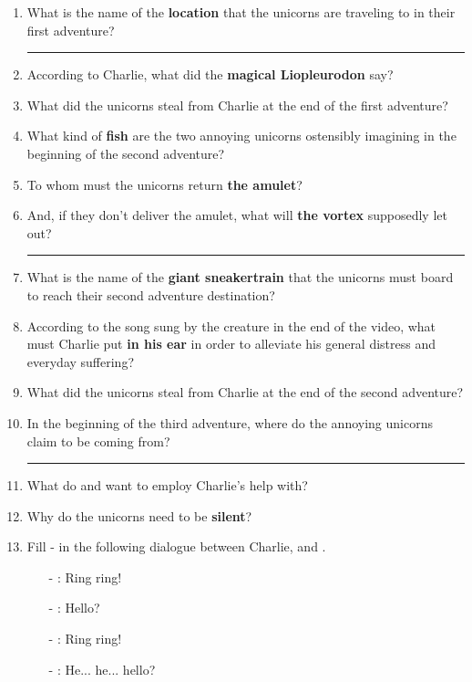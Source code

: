 \documentclass[letterpaper,12pt]{article}
\begin{document}
\begin{enumerate}[label=(\alph*)]
\setlength{\itemsep}{10pt}
	\item What is the name of the \textbf{location} that the unicorns are traveling to in their first adventure? \\  \hrule 
	\item According to Charlie, what did the \textbf{magical Liopleurodon} say? \hrulefill 
	\item What did the unicorns steal from Charlie at the end of the first adventure? \hrulefill
	\item What kind of \textbf{fish} are the two annoying unicorns ostensibly imagining in the beginning of the second adventure? \hrulefill 
	\item To whom must the unicorns return \textbf{the amulet}? \hrulefill 
	\item And, if they don't deliver the amulet, what will \textbf{the vortex} supposedly let out? \hrulefill \\ \hrule 
	\item What is the name of the \textbf{giant sneakertrain }that the unicorns must board to reach their second adventure destination? \hrulefill 
	\item According to the song sung by the creature in the end of the video, what must Charlie put \textbf{in his ear} in order to alleviate his general distress and everyday suffering? \hrulefill
		\item What did the unicorns steal from Charlie at the end of the second adventure? \hrulefill
		\item In the beginning of the third adventure, where do the annoying unicorns claim to be coming from? \\ \hrule
		\item What do \Redun{} and \Blueun{} want to employ Charlie's help with?\hrulefill
		\item Why do the unicorns need to be \textbf{silent}? \hrulefill
		\item Fill - in the following dialogue between Charlie,  \Redun{} and \Blueun{}.
					\begin{itemize}
							\em
							\item [-] \Blueun : Ring ring!
							\item[-] \Redun: Hello?			
							\item[-] \Blueun : Ring ring!
							\item[-] \Redun: He... he... hello?			

\end{itemize}
\end{enumerate}
\end{document}
